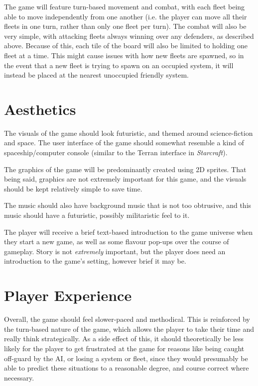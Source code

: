 \documentclass[10pt]{article}
\begin{document}
The game will feature turn-based movement and combat, with each fleet being able to move independently from one another
(i.e. the player can move all their fleets in one turn, rather than only one fleet per turn). The combat will also be very simple,
with attacking fleets always winning over any defenders, as described above. Because of this, each tile of the board will also be limited
to holding one fleet at a time. This might cause issues with how new fleets are spawned, so in the event that a new fleet is trying to spawn
on an occupied system, it will instead be placed at the nearest unoccupied friendly system.

\section{Aesthetics}

The visuals of the game should look futuristic, and themed around science-fiction and space.
The user interface of the game should somewhat resemble a kind of spaceship/computer console
(similar to the Terran interface in \textit{Starcraft}).

The graphics of the game will be predominantly created using 2D sprites. That being said,
graphics are not extremely important for this game, and the visuals should be kept relatively simple
to save time.

The music should also have background music that is not too obtrusive, and this music should have
a futuristic, possibly militaristic feel to it.

The player will receive a brief text-based introduction to the game universe when they start a new game, as well as
some flavour pop-ups over the course of gameplay. Story is not \textit{extremely} important, but the player does need an
introduction to the game's setting, however brief it may be.

\section{Player Experience}

Overall, the game should feel slower-paced and methodical. This is reinforced by the turn-based nature of the game,
which allows the player to take their time and really think strategically. As a side effect of this, it should
theoretically be less likely for the player to get frustrated at the game for reasons like being caught off-guard
by the AI, or losing a system or fleet, since they would presumably be able to predict these situations to a reasonable degree,
and course correct where necessary.
\end{document}
